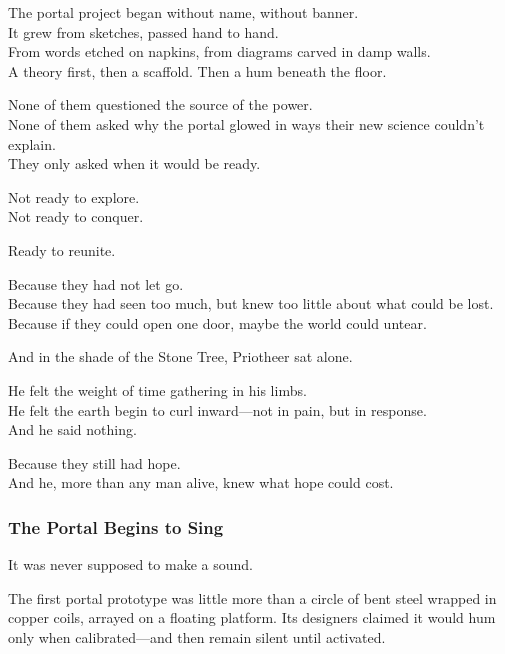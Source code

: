 \documentclass[12pt]{article}
\begin{document}
\vspace{0.5em}
The portal project began without name, without banner.\\
It grew from sketches, passed hand to hand.\\
From words etched on napkins, from diagrams carved in damp walls.\\
A theory first, then a scaffold. Then a hum beneath the floor.

\vspace{0.5em}
None of them questioned the source of the power.\\
None of them asked why the portal glowed in ways their new science couldn’t explain.\\
They only asked when it would be ready.

\vspace{0.5em}
Not ready to explore.\\
Not ready to conquer.

\vspace{0.5em}
Ready to reunite.

\vspace{0.5em}
Because they had not let go.\\
Because they had seen too much, but knew too little about what could be lost.\\
Because if they could open one door, maybe the world could untear.

\vspace{0.5em}
And in the shade of the Stone Tree, Priotheer sat alone.

\vspace{0.5em}
He felt the weight of time gathering in his limbs.\\
He felt the earth begin to curl inward---not in pain, but in response.\\
And he said nothing.

\vspace{0.5em}
Because they still had hope.\\
And he, more than any man alive, knew what hope could cost.


\dotfill


\subsubsection*{The Portal Begins to Sing}

It was never supposed to make a sound.

\vspace{0.5em}
The first portal prototype was little more than a circle of bent steel wrapped in copper coils, arrayed on a floating platform. Its designers claimed it would hum only when calibrated---and then remain silent until activated.
\end{document}
